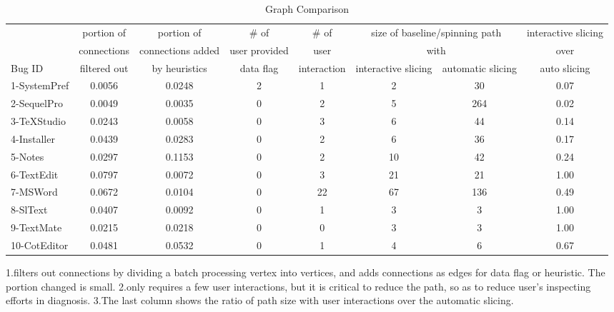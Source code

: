 \begin{table*}[ht]
\footnotesize
\centering
  \begin{tabularx}{\textwidth}{l|ccccccc}
 	   & portion of & portion of & \# of& \# of & \multicolumn{2}{c}{size of baseline/spinning path}& interactive slicing\\
       & connections & connections added  & user provided & user  & \multicolumn{2}{c}{with}  & over \\
Bug ID & filtered out & by heuristics & data flag & interaction & interactive slicing & automatic slicing &  auto slicing\\
\hline
\hline
1-SystemPref & 0.0056 & 0.0248 & 2 & 1 & 2 & 30 & 0.07\\
2-SequelPro & 0.0049 & 0.0035 & 0 & 2 & 5 & 264 & 0.02\\
3-TeXStudio & 0.0243 & 0.0058 & 0 & 3 & 6 & 44  & 0.14\\
4-Installer & 0.0439 & 0.0283 & 0 & 2 & 6 & 36  & 0.17\\
5-Notes & 0.0297 & 0.1153 & 0 & 2 & 10 & 42 & 0.24\\
6-TextEdit & 0.0797 & 0.0072 & 0 & 3 & 21 & 21 & 1.00\\
7-MSWord & 0.0672 & 0.0104 & 0 & 22 & 67 & 136 & 0.49\\
8-SlText & 0.0407 & 0.0092 & 0 & 1 & 3 & 3 & 1.00\\
9-TextMate & 0.0215 & 0.0218 & 0 & 0 & 3 & 3 & 1.00\\
10-CotEditor & 0.0481 & 0.0532 & 0 & 1 & 4 & 6 & 0.67\\

\hline
  \end{tabularx}

  \parbox{\textwidth}
  {\caption{Graph Comparison} 
	  {1.\xxx filters out connections by dividing a batch processing vertex into
		  vertices, and adds connections as edges for data flag or heuristic. The portion
		  changed is small. 2.\xxx only requires a few user interactions, but it is
		  critical to reduce the path, so as to reduce user's inspecting efforts in
		  diagnosis. 3.The last column shows the ratio of path size with user interactions
	  over the automatic slicing.}
  \label{table:results}
  }

\end{table*}


